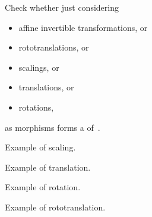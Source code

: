 \begin{exercise}
    \label{ex:draw}
    Check whether just considering
    \begin{itemize}
        \item affine invertible transformations, or
        \item rototranslations, or
        \item scalings, or
        \item translations, or
        \item rotations,
    \end{itemize}
    as morphisms forms a  of~\Draw.
\end{exercise}
\begin{solution}
    \begin{marginfigure}
        \begin{center}
        \end{center}
        \caption{Example of scaling.}
    \end{marginfigure}

    \begin{marginfigure}
        \begin{center}
        \end{center}
        \caption{Example of translation.}
    \end{marginfigure}

    \begin{marginfigure}
        \begin{center}
        \end{center}
        \caption{Example of rotation.}
    \end{marginfigure}

    \begin{marginfigure}
        \begin{center}
        \end{center}
        \caption{Example of rototranslation.}
    \end{marginfigure}


\end{solution}
